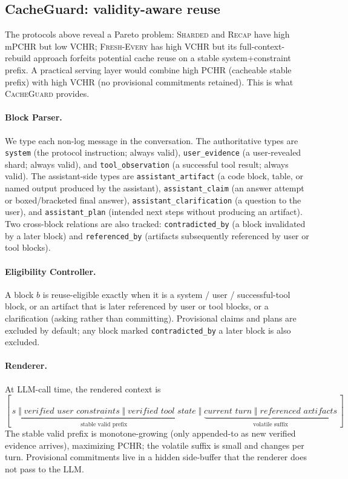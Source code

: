 \documentclass{article}
\begin{document}
\subsection{CacheGuard: validity-aware reuse}
\label{sec:cacheguard}

The protocols above reveal a Pareto problem: \textsc{Sharded} and \textsc{Recap} have high mPCHR but low VCHR; \textsc{Fresh-Every} has high VCHR but its full-context-rebuild approach forfeits potential cache reuse on a stable system+constraint prefix. A practical serving layer would combine high PCHR (cacheable stable prefix) with high VCHR (no provisional commitments retained). This is what \textsc{CacheGuard} provides.

\paragraph{Block Parser.}
\label{sec:eligibility}
We type each non-log message in the conversation. The authoritative types are \texttt{system} (the protocol instruction; always valid), \texttt{user\_evidence} (a user-revealed shard; always valid), and \texttt{tool\_observation} (a successful tool result; always valid). The assistant-side types are \texttt{assistant\_artifact} (a code block, table, or named output produced by the assistant), \texttt{assistant\_claim} (an answer attempt or boxed/bracketed final answer), \texttt{assistant\_clarification} (a question to the user), and \texttt{assistant\_plan} (intended next steps without producing an artifact). Two cross-block relations are also tracked: \texttt{contradicted\_by} (a block invalidated by a later block) and \texttt{referenced\_by} (artifacts subsequently referenced by user or tool blocks).

\paragraph{Eligibility Controller.}
A block $b$ is reuse-eligible exactly when it is a system / user / successful-tool block, or an artifact that is later referenced by user or tool blocks, or a clarification (asking rather than committing). Provisional claims and plans are excluded by default; any block marked \texttt{contradicted\_by} a later block is also excluded.

\paragraph{Renderer.}
At LLM-call time, the rendered context is
\[
[\,\underbrace{s\;\Vert\;\textit{verified user constraints}\;\Vert\;\textit{verified tool state}}_{\text{stable valid prefix}}\;\Vert\;\underbrace{\textit{current turn}\;\Vert\;\textit{referenced artifacts}}_{\text{volatile suffix}}\,].
\]
The stable valid prefix is monotone-growing (only appended-to as new verified evidence arrives), maximizing PCHR; the volatile suffix is small and changes per turn. Provisional commitments live in a hidden side-buffer that the renderer does not pass to the LLM.
\end{document}
